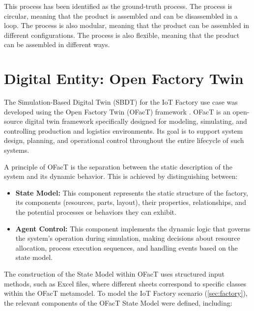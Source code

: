 This process has been identified as the ground-truth process. The process is circular, meaning that the product is assembled and can be disassembled in a loop. The process is also modular, meaning that the product can be assembled in different configurations. The process is also flexible, meaning that the product can be assembled in different ways.
\section{Digital Entity: Open Factory Twin}
\label{sec:automated-digital-twin}

The Simulation-Based Digital Twin (SBDT) for the IoT Factory use case was developed using the Open Factory Twin (OFacT) framework \autocite{ofact-intern}. OFacT is an open-source digital twin framework specifically designed for modeling, simulating, and controlling production and logistics environments. Its goal is to support system design, planning, and operational control throughout the entire lifecycle of such systems.

A principle of OFacT is the separation between the static description of the system and its dynamic behavior. This is achieved by distinguishing between:

\begin{itemize}
  \item \textbf{State Model:} This component represents the static structure of the factory, its components (resources, parts, layout), their properties, relationships, and the potential processes or behaviors they can exhibit.
  \item \textbf{Agent Control:} This component implements the dynamic logic that governs the system's operation during simulation, making decisions about resource allocation, process execution sequences, and handling events based on the state model.
\end{itemize}

The construction of the State Model within OFacT uses structured input methods, such as Excel files, where different sheets correspond to specific classes within the OFacT metamodel. To model the IoT Factory scenario (\autoref{sec:factory}), the relevant components of the OFacT State Model were defined, including:

